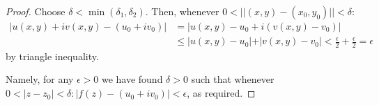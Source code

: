\begin{proof}
Choose $\delta < \min(\delta_1, \delta_2)$. Then, whenever $0 < \vert \vert (x, y) - (x_0, y_0)\vert \vert  < \delta$:
\begin{align*} 
    \vert u(x, y) + iv(x, y) - (u_0 + iv_0)\vert  &= \vert u(x, y) - u_0 + i(v(x, y) - v_0)\vert  \\ 
    & \leq \vert u(x, y) - u_0\vert  + \vert v(x, y) - v_0\vert  < \frac{\epsilon}{2} + \frac{\epsilon}{2} = \epsilon
\end{align*}
by triangle inequality.

Namely, for any $\epsilon > 0$ we have found $\delta > 0$ such that whenever $0 < \vert z - z_0\vert  < \delta: \vert f(z) - (u_0 + iv_0)\vert  < \epsilon$, as required.
\end{proof}